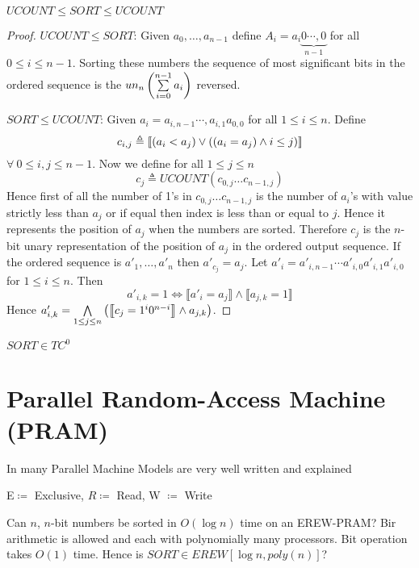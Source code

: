 \begin{theorem}
	$UCOUNT\leq SORT\leq UCOUNT$
\end{theorem}
\begin{proof} $UCOUNT\leq SORT$: 	Given $a_0,\dots, a_{n-1}$ define $A_i=a_i\underbrace{0\cdots,0}_{n-1}$ for all $0\leq i\leq n-1$. Sorting these numbers the sequence of most significant bits in the ordered sequence is the $un_n\left( \sum\limits_{i=0}^{n-1}a_i\right)$ reversed.

$SORT\leq UCOUNT$: Given $a_i=a_{i,n-1}\cdots, a_{i,1}a_{0,0}$ for all $1\leq i\leq n$.  Define $$c_{i,j}\triangleq\left\llbracket(a_i<a_j)\vee ((a_i=a_j)\wedge i\leq j)\right\rrbracket$$ $\forall\ 0\leq i,j\leq n-1$. Now we define for all $1\leq j\leq n$ $$c_j\triangleq UCOUNT(c_{0,j}\dots c_{n-1,j})$$Hence first of all the number of 1's in $c_{0,j}\dots c_{n-1,j}$ is the number of $a_i$'s with value strictly less than $a_j$ or if equal then index is less than or equal to $j$. Hence it represents the position of $a_j$ when the numbers are sorted. Therefore $c_j$ is the $n$-bit unary representation of the position of $a_j$ in the ordered output sequence. If the ordered sequence is $a'_{1}, \dots, a'_{n}$ then $a'_{c_j}=a_j$. Let $a'_i=a'_{i,n-1}\cdots a'_{i,0}a'_{i,1}a'_{i,0}$ for $1\leq i\leq n$. Then $$a'_{i,k}=1\iff \llbracket a'_{i}=a_j\rrbracket \wedge \llbracket a_{j,k}=1\rrbracket$$ Hence $a'_{i,k}=\bigwedge\limits_{1\leq j\leq n}\left(\left\llbracket c_j=1^i0^{n-i}\right\rrbracket \wedge a_{j,k}  \right)$.
\end{proof}

\begin{corollary}
	$SORT\in TC^0$
\end{corollary}


\section{Parallel Random-Access Machine (PRAM)}
In \cite{karpramachandran} many Parallel Machine Models are very well written and explained
\begin{definition}
	E$\coloneqq$ Exclusive, $R\coloneqq$ Read, W $\coloneqq $ Write 
\end{definition}
\begin{question}
	Can $n$, $n$-bit numbers be sorted in $O(\log n)$ time on an EREW-PRAM? Bir arithmetic is allowed and each with polynomially many processors. Bit operation takes $O(1)$ time. Hence is $SORT\in EREW[\log n,poly(n)]$?
\end{question}

